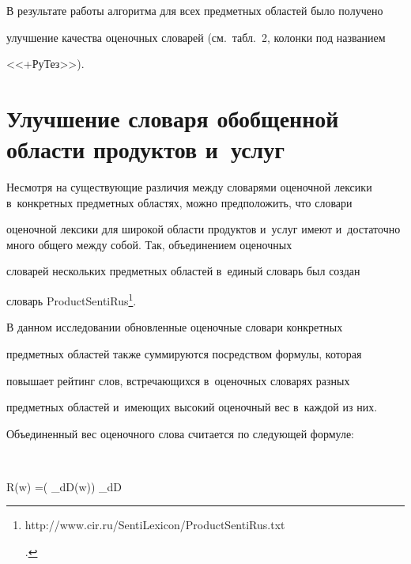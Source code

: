













В результате работы алгоритма для всех предметных областей было получено


улучшение качества оценочных словарей (см.\ табл.~2, колонки под названием


<<+РуТез>>).





\section{Улучшение словаря обобщенной области продуктов и~услуг}





Несмотря на существующие различия между словарями оценочной лексики в~конкретных предметных областях, можно предположить, что словари


оценочной лексики для широкой области продуктов и~услуг имеют и~достаточно много общего между собой. Так, объединением оценочных


словарей нескольких предметных областей в~единый словарь был создан


словарь ProductSentiRus\footnote{{\sf


http://www.cir.ru/SentiLexicon/ProductSentiRus.txt}.}.





     В данном исследовании обновленные оценочные словари конкретных


предметных областей также суммируются посредством формулы, которая


повышает рейтинг слов, встречающихся в~оценочных словарях разных


предметных областей и~имеющих высокий оценочный вес в~каждой из них.











	Объединенный вес оценочного слова считается по следующей формуле:


$$


R(w) =\max \left( \limits_{d\in D}(w)\right) \sum\limits_{d\in D}



